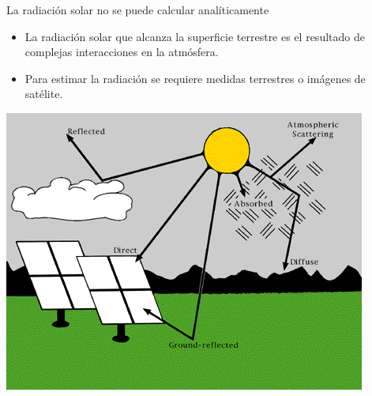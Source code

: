 \documentclass[xcolor={usenames,svgnames,dvipsnames}]{beamer}
\begin{document}
\begin{frame}[label={sec:orgd4e076b}]{La radiación solar no se puede calcular analíticamente}
\begin{itemize}
\item La radiación solar que alcanza la superficie terrestre es el resultado de complejas interacciones en la atmósfera.
\item Para estimar la radiación se requiere medidas terrestres o imágenes de satélite.
\end{itemize}
\begin{center}
\includegraphics[height=0.5\textheight]{../figs/SolarRadiationComponents_NREL.png}
\end{center}
\end{frame}
\end{document}
